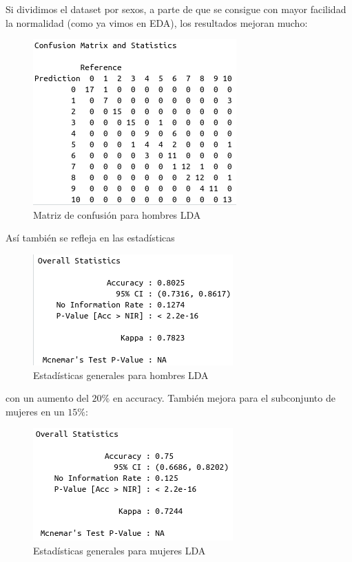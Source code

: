 Si dividimos el dataset por sexos, a parte de que se consigue con mayor facilidad la normalidad (como ya vimos en EDA), los resultados mejoran mucho:

\begin{figure}[H] %
	\centering
	\includegraphics[scale=0.6]{cm-hombres.png}  %
	\caption{Matriz de confusión para hombres LDA} 
	\label{fig:cm-hombres}
\end{figure}

Así también se refleja en las estadísticas

\begin{figure}[H] %
	\centering
	\includegraphics[scale=0.6]{statis-hombres.png}  %
	\caption{Estadísticas generales para hombres LDA} 
	\label{fig:statis-hombres}
\end{figure}

con un aumento del $20\%$ en accuracy. También mejora para el subconjunto de mujeres en un $15\%$:

\begin{figure}[H] %
	\centering
	\includegraphics[scale=0.6]{statis-mujeres.png}  %
	\caption{Estadísticas generales para mujeres LDA} 
	\label{fig:statis-mujeres}
\end{figure}

